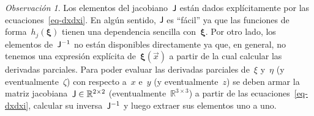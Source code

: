 \documentclass[
  12pt,
  a4paper,
  table]{scrbook}
\theoremstyle{plain}
\theoremstyle{definition}
\theoremstyle{plain}
\theoremstyle{plain}
\theoremstyle{remark}
\newtheorem*{remark}{Observación}
\begin{document}
\begin{remark}

Los elementos del jacobiano~\(\mathsf{J}\) están dados explícitamente por
las ecuaciones~\ref{eq-dxdxi}. En algún sentido, \(\mathsf{J}\) es
``fácil'' ya que las funciones de forma~\(h_j(\symbf{\xi})\) tienen una
dependencia sencilla con~\(\symbf{\xi}\). Por otro lado, los elementos
de~\(\mathsf{J}^{-1}\) no están disponibles directamente ya que, en
general, no tenemos una expresión explícita de~\(\symbf{\xi}(\vec{x})\)
a partir de la cual calcular las derivadas parciales. Para poder evaluar
las derivadas parciales de~\(\xi\) y~\(\eta\) (y
eventualmente~\(\zeta\)) con respecto a~\(x\) e~\(y\) (y
eventualmente~\(z\)) se deben armar la matriz
jacobiana~\(\mathsf{J} \in \mathbb{R}^{2 \times 2}\)
(eventualmente~\(\mathbb{R}^{3 \times 3}\)) a partir de las
ecuaciones~\ref{eq-dxdxi}, calcular su inversa~\(\mathsf{J}^{-1}\) y luego
extraer sus elementos uno a uno.

\end{remark}
\end{document}
